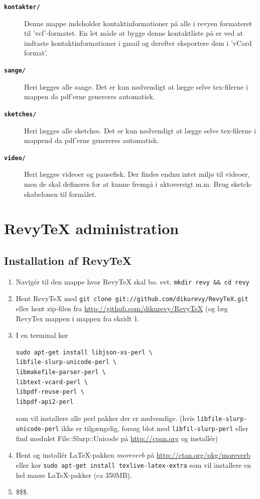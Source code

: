 \documentclass{article}
\newcommand{\fname}[1]{\textbf{\texttt{#1}}}
\newcommand{\shellcmd}[1]{\texttt{#1}}
\begin{document}
\begin{description}
\item[\fname{kontakter/}] Denne mappe indeholder kontaktinformationer på alle i
revyen formateret til 'vcf'-formatet. En let måde at bygge denne
kontaktliste på er ved at indtaste kontaktinformationer i gmail og
derefter eksportere dem i 'vCard format'.
\item[\fname{sange/}] Heri lægges alle sange. Det er kun nødvendigt at lægge
selve tex-filerne i mappen da pdf'erne genereres automatisk.
\item[\fname{sketches/}] Heri lægges alle sketches. Det er kun nødvendigt at
lægge selve tex-filerne i mappend da pdf'erne genereres automatisk.
\item[\fname{video/}] Heri lægges videoer og pausefisk. Der findes endnu intet
miljø til videoer, men de skal defineres for at kunne fremgå i
aktoversigt m.m. Brug sketch-skabelonen til formålet.
\end{description}

\section{RevyTeX administration}
\subsection{Installation af RevyTeX}
\begin{enumerate}
\item Navigér til den mappe hvor RevyTeX skal bo. evt. \shellcmd{mkdir
revy \&\& cd revy}
\item Hent RevyTeX med \shellcmd{git clone
git://github.com/dikurevy/RevyTeX.git} eller hent zip-filen fra
\url{http://github.com/dikurevy/RevyTeX} (og læg RevyTex mappen i mappen
fra skridt 1.
\item I en terminal kør 
\begin{verbatim}
sudo apt-get install libjson-xs-perl \
libfile-slurp-unicode-perl \
libmakefile-parser-perl \
libtext-vcard-perl \
libpdf-reuse-perl \
libpdf-api2-perl
\end{verbatim} som vil installere alle
perl pakker der er nødvendige. (hvis \shellcmd{libfile-slurp-unicode-perl} ikke
er tilgængelig, forsøg blot med \shellcmd{libfil-slurp-perl} eller find modulet File::Slurp::Unicode på
\url{http://cpan.org} og installér)
\item Hent og installér \LaTeX-pakken \textit{moreverb} på
\url{http://ctan.org/pkg/moreverb} eller kør \shellcmd{sudo apt-get
install texlive-latex-extra} som vil installere en hel masse
\LaTeX-pakker (ca 350MB).
\item \$\$\$.
\end{enumerate}
\end{document}
